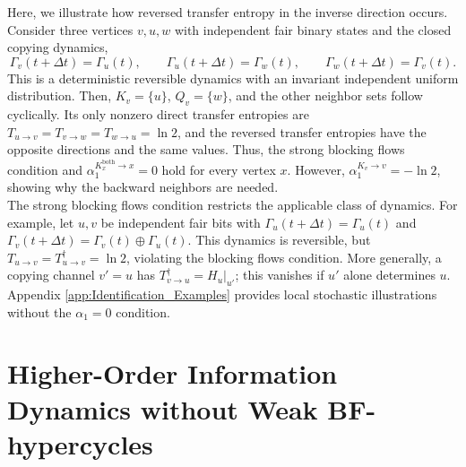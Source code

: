 \documentclass{comnet}%
\begin{document}
Here, we illustrate how reversed transfer entropy in the inverse direction occurs. Consider three vertices $v,u,w$ with independent fair binary states and the closed copying dynamics,
\begin{equation}\label{eq:Copying_Cycle}
 \Gamma_v(t+\Delta t)=\Gamma_u(t),\qquad
 \Gamma_u(t+\Delta t)=\Gamma_w(t),\qquad
 \Gamma_w(t+\Delta t)=\Gamma_v(t).
\end{equation}
This is a deterministic reversible dynamics with an invariant independent uniform distribution. Then, $K_v=\{u\}$, $Q_v=\{w\}$, and the other neighbor sets follow cyclically. Its only nonzero direct transfer entropies are $T_{u\to v}=T_{v\to w}=T_{w\to u}=\ln 2$, and the reversed transfer entropies have the opposite directions and the same values. Thus, the strong blocking flows condition and $\alpha_1^{K^{\mathrm{both}}_x\to x}=0$ hold for every vertex $x$. However, $\alpha_1^{K_v\to v}=-\ln 2$, showing why the backward neighbors are needed.\\

The strong blocking flows condition restricts the applicable class of dynamics. For example, let $u,v$ be independent fair bits with $\Gamma_u(t+\Delta t)=\Gamma_u(t)$ and $\Gamma_v(t+\Delta t)=\Gamma_v(t)\oplus\Gamma_u(t)$. This dynamics is reversible, but $T_{u\to v}=T^{\dagger}_{u\to v}=\ln 2$, violating the blocking flows condition. More generally, a copying channel $v'=u$ has $T^{\dagger}_{v\to u}=H_u|_{u'}$; this vanishes if $u'$ alone determines $u$. Appendix \ref{app:Identification_Examples} provides local stochastic illustrations without the $\alpha_1=0$ condition.\\

\section{\label{sec:ID_without_Cycle}Higher-Order Information Dynamics without Weak BF-hypercycles}
\end{document}
